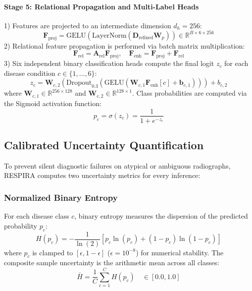 \documentclass[journal]{IEEEtran}
\begin{document}
\paragraph{Stage 5: Relational Propagation and Multi-Label Heads}
1) Features are projected to an intermediate dimension $d_h = 256$:
\begin{equation}
\mathbf{F}_{\text{proj}} = \text{GELU}(\text{LayerNorm}(\mathbf{D}_{\text{refined}}\mathbf{W}_p)) \in \mathbb{R}^{B \times 6 \times 256}
\end{equation}
2) Relational feature propagation is performed via batch matrix multiplication:
\begin{equation}
\mathbf{F}_{\text{rel}} = \mathbf{A}_{\text{rel}} \mathbf{F}_{\text{proj}}, \quad \mathbf{F}_{\text{enh}} = \mathbf{F}_{\text{proj}} + \mathbf{F}_{\text{rel}}
\end{equation}
3) Six independent binary classification heads compute the final logit $z_c$ for each disease condition $c \in \{1, \dots, 6\}$:
\begin{equation}
z_c = \mathbf{W}_{c, 2} \left( \text{Dropout}_{0.3}(\text{GELU}(\mathbf{W}_{c, 1} \mathbf{F}_{\text{enh}}[c] + \mathbf{b}_{c, 1})) \right) + b_{c, 2}
\end{equation}
where $\mathbf{W}_{c, 1} \in \mathbb{R}^{256 \times 128}$ and $\mathbf{W}_{c, 2} \in \mathbb{R}^{128 \times 1}$. Class probabilities are computed via the Sigmoid activation function:
\begin{equation}
p_c = \sigma(z_c) = \frac{1}{1 + e^{-z_c}}
\end{equation}

\subsection{Calibrated Uncertainty Quantification}
\label{subsec:uncertainty}

To prevent silent diagnostic failures on atypical or ambiguous radiographs, RESPIRA computes two uncertainty metrics for every inference:

\subsubsection{Normalized Binary Entropy}
For each disease class $c$, binary entropy measures the dispersion of the predicted probability $p_c$:
\begin{equation}
H(p_c) = -\frac{1}{\ln(2)} \left[ p_c \ln(p_c) + (1 - p_c)\ln(1 - p_c) \right]
\label{eq:binary_entropy}
\end{equation}
where $p_c$ is clamped to $[\epsilon, 1 - \epsilon]$ ($\epsilon = 10^{-8}$) for numerical stability. The composite sample uncertainty is the arithmetic mean across all classes:
\begin{equation}
\bar{H} = \frac{1}{C}\sum_{c=1}^C H(p_c) \quad \in [0.0, 1.0]
\end{equation}
\end{document}
